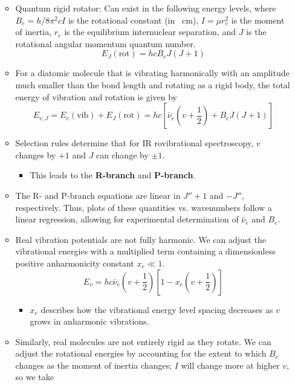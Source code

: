 \documentclass[../notes.tex]{subfiles}
\begin{document}
\begin{itemize}
\begin{itemize}
\begin{equation*}
        \end{equation*}
        \item Quantum rigid rotator: Can exist in the following energy levels, where $B_e=h/8\pi^2cI$ is the rotational constant (in \si{\per\centi\meter}), $I=\mu r_e^2$ is the moment of inertia, $r_e$ is the equilibrium internuclear separation, and $J$ is the rotational angular momentum quantum number.
        \begin{equation*}
            E_J(\text{rot}) = hcB_eJ(J+1)
        \end{equation*}
        \item For a diatomic molecule that is vibrating harmonically with an amplitude much smaller than the bond length and rotating as a rigid body, the total energy of vibration and rotation is given by
        \begin{equation*}
            E_{v,J} = E_v(\text{vib})+E_J(\text{rot})
            = hc\left[ \bar{\nu}_e\left( v+\frac{1}{2} \right)+B_eJ(J+1) \right]
        \end{equation*}
        \item Selection rules determine that for IR rovibrational spectroscopy, $v$ changes by $+1$ and $J$ can change by $\pm 1$.
        \begin{itemize}
            \item This leads to the \textbf{R-branch} and \textbf{P-branch}.
        \end{itemize}
        \item The R- and P-branch equations are linear in $J''+1$ and $-J''$, respectively. Thus, plots of these quantities vs. wavenumbers follow a linear regression, allowing for experimental determination of $\bar{\nu}_e$ and $B_e$.
        \item Real vibration potentials are not fully harmonic. We can adjust the vibrational energies with a multiplied term containing a dimensionless positive anharmonicity constant $x_e\ll 1$.
        \begin{equation*}
            E_v = hc\bar{\nu}_e\left( v+\frac{1}{2} \right)\left[ 1-x_e\left( v+\frac{1}{2} \right) \right]
        \end{equation*}
        \begin{itemize}
            \item $x_e$ describes how the vibrational energy level spacing decreases as $v$ grows in anharmonic vibrations.
        \end{itemize}
        \item Similarly, real molecules are not entirely rigid as they rotate. We can adjust the rotational energies by accounting for the extent to which $B_e$ changes as the moment of inertia changes; $I$ will change more at higher $v$, so we take

\end{itemize}
\end{itemize}
\end{document}
